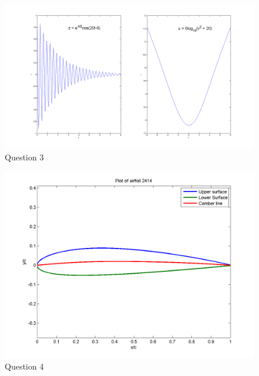 \documentclass[11pt,a4paper]{report}
\begin{document}
\begin{center}
\begin{figure}[!h]
\includegraphics[scale=0.4]{Giri_Subramanian_HW_1_Problem_3}
\caption{Question 3}
\end{figure}

\begin{figure}[!h]
\includegraphics[scale=0.75]{Giri_Subramanian_HW_1_Problem_4}
\caption{Question 4}
\end{figure}
\end{center}
\end{document}
